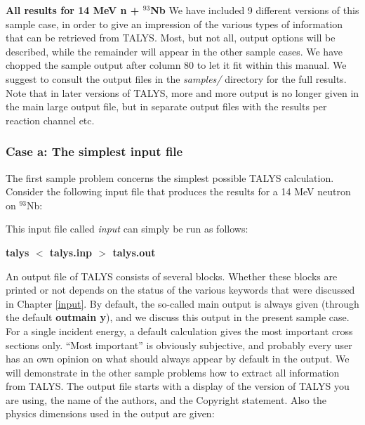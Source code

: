 \begin{samplecase}
{\bf All results for 14 MeV n + ${}^{93}$Nb}\newline
We have included 9 different versions of this sample case, in order to give an 
impression of the various types of information that can be retrieved from 
TALYS.  Most, but not all, output options will be described, while the 
remainder will appear in the other sample cases. We have chopped the sample 
output after column 80 to let it fit within this manual. We suggest to consult 
the output files in the {\em samples/} directory for the full results.
Note that in later versions of TALYS, more and more output is no longer given in the main large output file, 
but in separate output files with the results per reaction channel etc.
\subsubsection{Case a: The simplest input file}
The first sample problem concerns the simplest possible TALYS calculation.
Consider the following input file that produces the
results for a 14 MeV neutron on ${}^{93}$Nb:


This input file called {\em input} can simply be run as follows:\newline

{\bf talys $<$ talys.inp $>$ talys.out}\newline

An output file of TALYS consists of several blocks. Whether these blocks are 
printed or not depends on the status of the various keywords that were 
discussed in Chapter \ref{input}. By 
default, the so-called main output is always given (through the default
{\bf outmain y}), and we discuss this output in the present sample case.
For a single incident energy, a default calculation gives the most important 
cross sections only. ``Most important'' is obviously subjective, and probably
every user has an own opinion on what should always appear by default in 
the output. We will demonstrate in the other sample problems how to extract all 
information from TALYS. 
The output file starts with a display of the version of TALYS you are using,
the name of the authors, and the Copyright statement. Also the physics 
dimensions used in the output are given:

{\small \begin{verbatim}


\end{verbatim}}
\end{samplecase}
